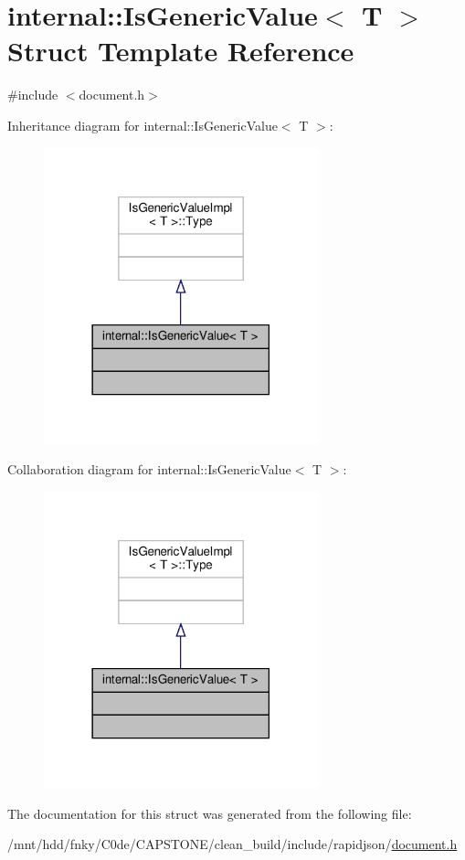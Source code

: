 \hypertarget{structinternal_1_1IsGenericValue}{}\section{internal\+:\+:Is\+Generic\+Value$<$ T $>$ Struct Template Reference}
\label{structinternal_1_1IsGenericValue}


{\ttfamily \#include $<$document.\+h$>$}



Inheritance diagram for internal\+:\+:Is\+Generic\+Value$<$ T $>$\+:
\nopagebreak
\begin{figure}[H]
\begin{center}
\leavevmode
\includegraphics[width=225pt]{structinternal_1_1IsGenericValue__inherit__graph}
\end{center}
\end{figure}


Collaboration diagram for internal\+:\+:Is\+Generic\+Value$<$ T $>$\+:
\nopagebreak
\begin{figure}[H]
\begin{center}
\leavevmode
\includegraphics[width=225pt]{structinternal_1_1IsGenericValue__coll__graph}
\end{center}
\end{figure}


The documentation for this struct was generated from the following file\+:\begin{DoxyCompactItemize}
\item 
/mnt/hdd/fnky/\+C0de/\+C\+A\+P\+S\+T\+O\+N\+E/clean\+\_\+build/include/rapidjson/\hyperlink{document_8h}{document.\+h}\end{DoxyCompactItemize}
